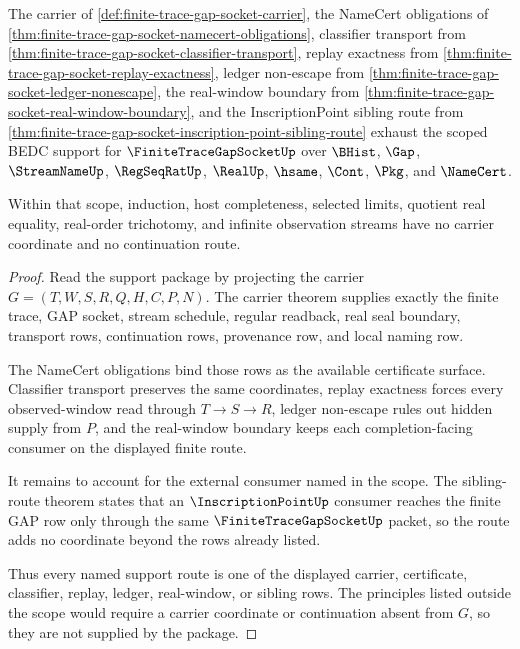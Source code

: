\begin{theorem}
\label{thm:finite-trace-gap-socket-scoped-support-package}
The carrier of \autoref{def:finite-trace-gap-socket-carrier}, the NameCert obligations of \autoref{thm:finite-trace-gap-socket-namecert-obligations}, classifier transport from \autoref{thm:finite-trace-gap-socket-classifier-transport}, replay exactness from \autoref{thm:finite-trace-gap-socket-replay-exactness}, ledger non-escape from \autoref{thm:finite-trace-gap-socket-ledger-nonescape}, the real-window boundary from \autoref{thm:finite-trace-gap-socket-real-window-boundary}, and the InscriptionPoint sibling route from \autoref{thm:finite-trace-gap-socket-inscription-point-sibling-route} exhaust the scoped BEDC support for $\FiniteTraceGapSocketUp$ over $\BHist$, $\Gap$, $\StreamNameUp$, $\RegSeqRatUp$, $\RealUp$, $\hsame$, $\Cont$, $\Pkg$, and $\NameCert$.

Within that scope, induction, host completeness, selected limits, quotient real equality, real-order trichotomy, and infinite observation streams have no carrier coordinate and no continuation route.
\end{theorem}
\begin{proof}
Read the support package by projecting the carrier $G=(T,W,S,R,Q,H,C,P,N)$. The carrier theorem supplies exactly the finite trace, GAP socket, stream schedule, regular readback, real seal boundary, transport rows, continuation rows, provenance row, and local naming row.

The NameCert obligations bind those rows as the available certificate surface. Classifier transport preserves the same coordinates, replay exactness forces every observed-window read through $T \to S \to R$, ledger non-escape rules out hidden supply from $P$, and the real-window boundary keeps each completion-facing consumer on the displayed finite route.

It remains to account for the external consumer named in the scope. The sibling-route theorem states that an $\InscriptionPointUp$ consumer reaches the finite GAP row only through the same $\FiniteTraceGapSocketUp$ packet, so the route adds no coordinate beyond the rows already listed.

Thus every named support route is one of the displayed carrier, certificate, classifier, replay, ledger, real-window, or sibling rows. The principles listed outside the scope would require a carrier coordinate or continuation absent from $G$, so they are not supplied by the package.
\end{proof}

